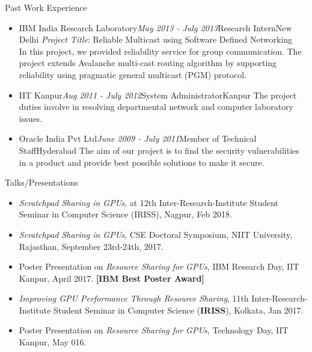 \documentclass{resume} %
\begin{document}

\begin{rSection}{Past Work Experience}
\begin{itemize}

\item \begin{rSubsection}{IBM India Research Laboratory}{\textit{May 2013 - July 2013}}{Research Intern}{New Delhi}
\textit{Project Title}: Reliable Multicast using Software Defined Networking \\
In this project, we provided reliability service for group communication. The project extends Avalanche multi-cast routing algorithm by supporting reliability using pragmatic general multicast (PGM) protocol.
\end{rSubsection}


\item \begin{rSubsection}{IIT Kanpur}{\textit{Aug 2011 - July 2012}}{System Administrator}{Kanpur}
The project duties involve in resolving departmental network and computer laboratory issues. 
\end{rSubsection}


\item \begin{rSubsection}{Oracle India Pvt Ltd}{\textit{June 2009 - July 2011}}{Member of Technical Staff}{Hyderabad}
The aim of our project is to find the security vulnerabilities in a product and provide best possible solutions to make it secure.
\end{rSubsection}


\end{itemize}
\end{rSection}



\begin{rSection}{Talks/Presentations}
\begin{itemize}
\item \textit{Scratchpad Sharing in GPUs}, at 12th Inter-Research-Institute Student Seminar in Computer Science (IRISS), Nagpur, Feb 2018. 
\item \textit{Scratchpad Sharing in GPUs}, CSE Doctoral Symposium, NIIT University, Rajasthan, September 23rd-24th, 2017.
\item Poster Presentation on \textit{Resource Sharing for GPUs}, IBM Research Day, IIT Kanpur, April 2017. \textbf{[IBM Best Poster Award]} 
\item \textit{Improving GPU Performance Through Resource Sharing}, 11th Inter-Research-Institute Student Seminar in Computer Science (\textbf{IRISS}), Kolkata, Jan 2017.
\item Poster Presentation on \textit{Resource Sharing for GPUs}, Technology Day, IIT Kanpur, May 016. 

\end{itemize}
\end{rSection}
\end{document}
